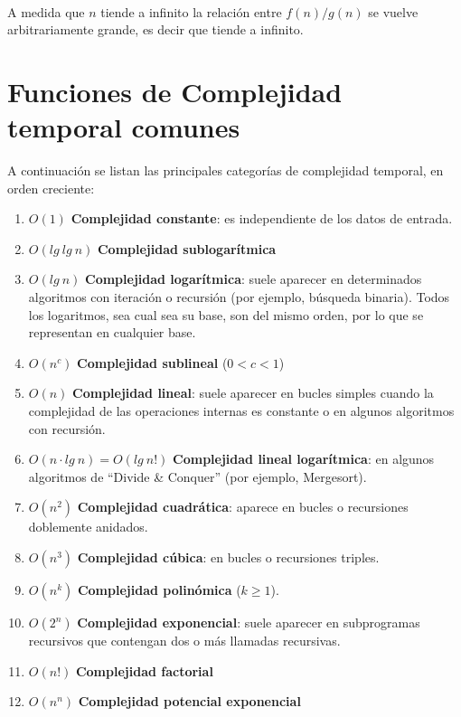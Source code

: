 ~

A medida que $n$ tiende a infinito la relaci\'on entre $f(n)/g(n)$ se vuelve arbitrariamente grande, es decir que tiende a infinito.

\section{Funciones de Complejidad temporal comunes}
A continuaci\'on se listan las principales categor\'ias de complejidad temporal, en orden creciente:
\begin{enumerate}
 \item $O(1)$ \textbf{Complejidad constante}: es independiente de los datos de entrada.
 \item $O(lg\ lg\ n)$ \textbf{Complejidad sublogar\'itmica}
 \item $O(lg\ n)$ \textbf{Complejidad logar\'itmica}: suele aparecer en determinados algoritmos con iteraci\'on o recursi\'on (por ejemplo, b\'usqueda binaria). Todos los logaritmos, sea cual sea su base, son del mismo orden, por lo que se representan en cualquier base.
 \item $O(n^c)$ \textbf{Complejidad sublineal} ($0 < c < 1$)
 \item $O(n)$ \textbf{Complejidad lineal}: suele aparecer en bucles simples cuando la complejidad de las operaciones internas es constante o en algunos algoritmos con recursi\'on.
 \item $O(n \cdot lg\ n) = O(lg\ n!)$ \textbf{Complejidad lineal logar\'itmica}: en algunos algoritmos de ``Divide \& Conquer'' (por ejemplo, Mergesort).
 \item $O(n^2)$ \textbf{Complejidad cuadr\'atica}: aparece en bucles o recursiones doblemente anidados.
 \item $O(n^3)$ \textbf{Complejidad c\'ubica}: en bucles o recursiones triples.
 \item $O(n^k)$ \textbf{Complejidad polin\'omica} ($k \geq 1$).
 \item $O(2^n)$ \textbf{Complejidad exponencial}: suele aparecer en subprogramas recursivos que contengan dos o m\'as llamadas recursivas.
 \item $O(n!)$ \textbf{Complejidad factorial}
 \item $O(n^n)$ \textbf{Complejidad potencial exponencial}
\end{enumerate}
